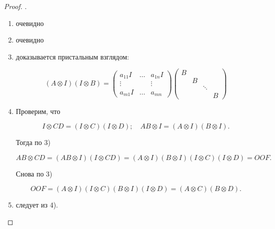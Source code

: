\begin{proof} .
    \begin{enumerate}
        \item очевидно
        \item очевидно
        \item доказывается пристальным взглядом:

            \[
                (A \otimes I) (I \otimes B) = \begin{pmatrix}
                    a_{1 1} I & \dots & a_{1 n} I \\
                    \vdots & & \vdots \\
                    a_{m 1} I & \dots & a_{m n}
                \end{pmatrix}
                \begin{pmatrix}
                    B & & & \\
                    & B & & \\
                    & & \ddots & \\
                    & & & B
                \end{pmatrix}
            \]

        \item Проверим, что

            \[
                I \otimes C D = (I \otimes C) (I \otimes D); \quad
                A B \otimes I = (A \otimes I) (B \otimes I).
            \]

            Тогда по 3)

            \[
                A B \otimes C D = (A B \otimes I) (I \otimes C D)
                = (A \otimes I) (B \otimes I) (I \otimes C) (I \otimes D)
                = OOF.
            \]

            Снова по 3)

            \[
                OOF = (A \otimes I) (I \otimes C) (B \otimes I) (I \otimes D)
                = (A \otimes C) (B \otimes D).
            \]

        \item следует из 4).
    \end{enumerate}
\end{proof}

